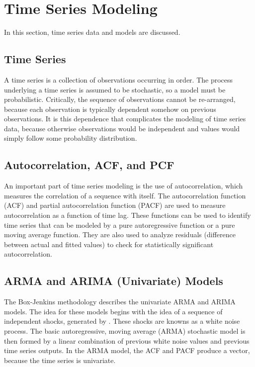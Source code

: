 \documentclass[a4paper]{scrartcl}
\begin{document}
\section*{Time Series Modeling}
\label{sec:time_series_modeling}
In this section, time series data and models are discussed.

\subsection*{Time Series}
A time series is a collection of observations occurring in order. The process underlying a time series is assumed to be stochastic, so a model must be probabilistic. Critically, the sequence of observations cannot be re-arranged, because each observation is typically dependent somehow on previous observations. It is this dependence that complicates the modeling of time series data, because otherwise observations would be independent and values would simply follow some probability distribution. 

\subsection*{Autocorrelation, ACF, and PCF}
An important part of time series modeling is the use of autocorrelation, which measures the correlation of a sequence with itself. The autocorrelation function (ACF) and partial autocorrelation function (PACF) are used to measure autocorrelation as a function of time lag. These functions can be used to identify time series that can be modeled by a pure autoregressive function or a pure moving average function. They are also used to analyze residuals (difference between actual and fitted values) to check for statistically significant autocorrelation. 

\subsection*{ARMA and ARIMA (Univariate) Models}
The Box-Jenkins methodology describes the univariate ARMA and ARIMA models. The idea for these models begins with the idea of a sequence of independent shocks, generated by \cite{box_jenkins_reinsel_2008}. These shocks are knowns as a white noise process. The basic autoregressive, moving average (ARMA) stochastic model is then formed by a linear combination of previous white noise values and previous time series outputs. In the ARMA model, the ACF and PACF produce a vector, because the time series is univariate.
\end{document}
